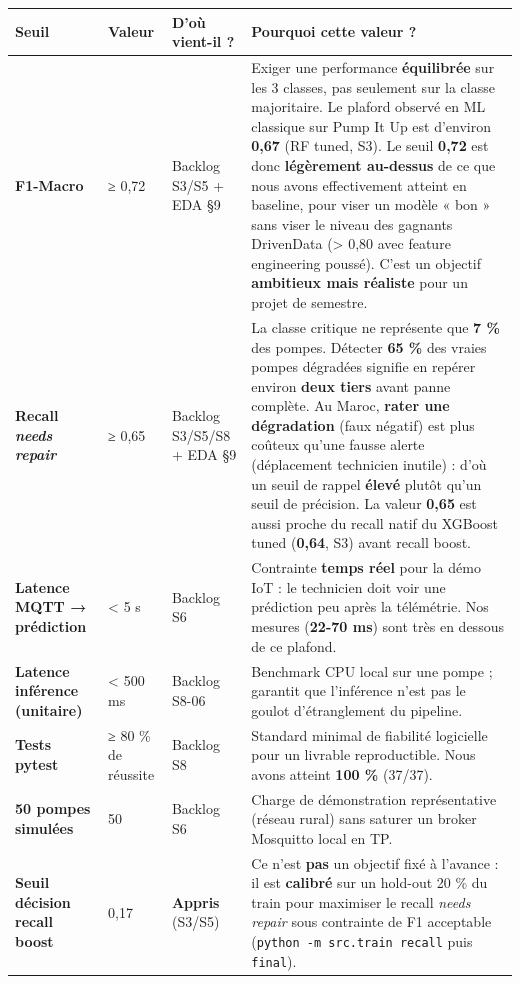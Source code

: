 \documentclass[11pt,a4paper]{report}
\begin{document}
\begin{longtable}{@{}llll@{}}
\toprule
Seuil & Valeur & D'où vient-il ? & Pourquoi cette valeur ? \\
\midrule
\textbf{F1-Macro} & ≥ 0,72 & Backlog S3/S5 + EDA §9 & Exiger une performance \textbf{équilibrée} sur les 3 classes, pas seulement sur la classe majoritaire. Le plaford observé en ML classique sur Pump It Up est d'environ \textbf{0,67} (RF tuned, S3). Le seuil \textbf{0,72} est donc \textbf{légèrement au-dessus} de ce que nous avons effectivement atteint en baseline, pour viser un modèle « bon » sans viser le niveau des gagnants DrivenData (> 0,80 avec feature engineering poussé). C'est un objectif \textbf{ambitieux mais réaliste} pour un projet de semestre. \\
\textbf{Recall \textit{needs repair}} & ≥ 0,65 & Backlog S3/S5/S8 + EDA §9 & La classe critique ne représente que \textbf{7 \%} des pompes. Détecter \textbf{65 \%} des vraies pompes dégradées signifie en repérer environ \textbf{deux tiers} avant panne complète. Au Maroc, \textbf{rater une dégradation} (faux négatif) est plus coûteux qu'une fausse alerte (déplacement technicien inutile) : d'où un seuil de rappel \textbf{élevé} plutôt qu'un seuil de précision. La valeur \textbf{0,65} est aussi proche du recall natif du XGBoost tuned (\textbf{0,64}, S3) avant recall boost. \\
\textbf{Latence MQTT → prédiction} & < 5 s & Backlog S6 & Contrainte \textbf{temps réel} pour la démo IoT : le technicien doit voir une prédiction peu après la télémétrie. Nos mesures (\textbf{22-70 ms}) sont très en dessous de ce plafond. \\
\textbf{Latence inférence (unitaire)} & < 500 ms & Backlog S8-06 & Benchmark CPU local sur une pompe ; garantit que l'inférence n'est pas le goulot d'étranglement du pipeline. \\
\textbf{Tests pytest} & ≥ 80 \% de réussite & Backlog S8 & Standard minimal de fiabilité logicielle pour un livrable reproductible. Nous avons atteint \textbf{100 \%} (37/37). \\
\textbf{50 pompes simulées} & 50 & Backlog S6 & Charge de démonstration représentative (réseau rural) sans saturer un broker Mosquitto local en TP. \\
\textbf{Seuil décision recall boost} & 0,17 & \textbf{Appris} (S3/S5) & Ce n'est \textbf{pas} un objectif fixé à l'avance : il est \textbf{calibré} sur un hold-out 20 \% du train pour maximiser le recall \textit{needs repair} sous contrainte de F1 acceptable (\texttt{python -m src.train recall} puis \texttt{final}). \\
\bottomrule
\end{longtable}
\end{document}
